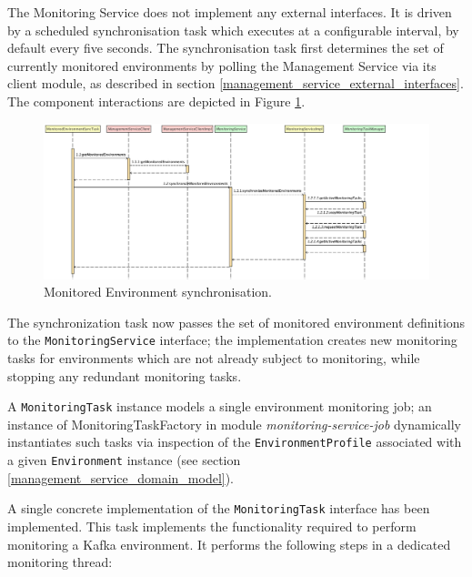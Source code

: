 The Monitoring Service does not implement any external interfaces. It is driven by a scheduled synchronisation task which executes at a configurable interval, by default every five seconds. The synchronisation task first determines the set of currently monitored environments by polling the Management Service via its client module, as described in section \ref{management_service_external_interfaces}. The component interactions are depicted in Figure \ref{monitoring_sync_task_sequence}.

\begin{figure}[H]
	\centering  
	\includegraphics[width=\linewidth]{figures/impl/monitor/sync_task_seq.png}
	\caption{Monitored Environment synchronisation.}
	\label{monitoring_sync_task_sequence}
\end{figure}

The synchronization task now passes the set of monitored environment definitions to the \texttt{MonitoringService} interface; the implementation creates new monitoring tasks for environments which are not already subject to monitoring, while stopping any redundant monitoring tasks.

A \texttt{MonitoringTask} instance models a single environment monitoring job; an instance of MonitoringTaskFactory in module \textit{monitoring-service-job} dynamically instantiates such tasks via inspection of the \texttt{EnvironmentProfile} associated with a given \texttt{Environment} instance (see section \ref{management_service_domain_model}).

A single concrete implementation of the  \texttt{MonitoringTask} interface has been implemented. This task  implements the functionality required to perform monitoring a Kafka environment. It performs the following  steps in a dedicated monitoring thread:

